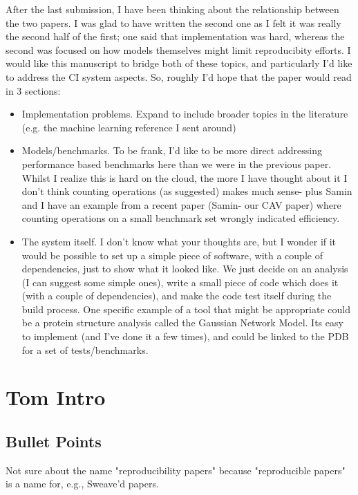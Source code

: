 \documentclass[a4paper,11pt]{article}
\begin{document}
After the last submission, I have been thinking about the relationship
between the two papers. I was glad to have written the second one as I
felt it was really the second half of the first; one said that
implementation was hard, whereas the second was focused on how models
themselves might limit reproducibity efforts. I would like this
manuscript to bridge both of these topics, and particularly I'd like
to address the CI system aspects. So, roughly I'd hope that the paper
would read in 3 sections:

 \begin{itemize}
\item Implementation problems. Expand to include broader topics in the
literature (e.g. the machine learning reference I sent around)

\item Models/benchmarks. To be frank, I'd like to be more direct
addressing performance based benchmarks here than we were in the
previous paper. Whilst I realize this is hard on the cloud, the more I
have thought about it I don't think counting operations (as suggested)
makes much sense- plus Samin and I have an example from a recent paper
(Samin- our CAV paper) where counting operations on a small benchmark
set wrongly indicated efficiency.

\item The system itself. I don't know what your thoughts are, but I
wonder if it would be possible to set up a simple piece of software,
with a couple of dependencies, just to show what it looked like. We
just decide on an analysis (I can suggest some simple ones), write a
small piece of code which does it (with a couple of dependencies), and
make the code test itself during the build process. One specific
example of a tool that might be appropriate could be a protein
structure analysis called the Gaussian Network Model. Its easy to
implement (and I've done it a few times), and could be linked to the
PDB for a set of tests/benchmarks.
\end{itemize}



\section{Tom Intro}

\subsection{Bullet Points}
Not sure about the name "reproducibility papers" because "reproducible
papers" is a name for, e.g., Sweave'd papers.
\end{document}

